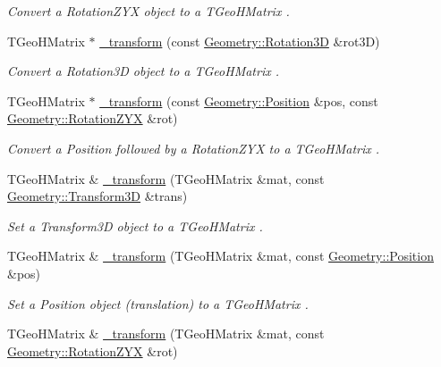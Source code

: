 \begin{DoxyCompactItemize}
\begin{DoxyCompactList}\small\item\em Convert a Rotation\+Z\+YX object to a T\+Geo\+H\+Matrix . \end{DoxyCompactList}\item 
T\+Geo\+H\+Matrix $\ast$ \hyperlink{group___d_d4_h_e_p___g_e_o_m_e_t_r_y_ga2b988c5fb8e427e757080009b3a4856f}{\+\_\+transform} (const \hyperlink{namespace_d_d4hep_1_1_geometry_a022fecb763315fa2bf39cbb648944a0e}{Geometry\+::\+Rotation3D} \&rot3D)
\begin{DoxyCompactList}\small\item\em Convert a Rotation3D object to a T\+Geo\+H\+Matrix . \end{DoxyCompactList}\item 
T\+Geo\+H\+Matrix $\ast$ \hyperlink{group___d_d4_h_e_p___g_e_o_m_e_t_r_y_gad6f7e93a5f8c5ae037658aa594d2f83b}{\+\_\+transform} (const \hyperlink{namespace_d_d4hep_1_1_geometry_a55083902099d03506c6db01b80404900}{Geometry\+::\+Position} \&pos, const \hyperlink{namespace_d_d4hep_1_1_geometry_a24667b2b9c3cec3d5239828db4d52189}{Geometry\+::\+Rotation\+Z\+YX} \&rot)
\begin{DoxyCompactList}\small\item\em Convert a Position followed by a Rotation\+Z\+YX to a T\+Geo\+H\+Matrix . \end{DoxyCompactList}\item 
T\+Geo\+H\+Matrix \& \hyperlink{group___d_d4_h_e_p___g_e_o_m_e_t_r_y_gae56d3e609e5195af8ba7271391b608e5}{\+\_\+transform} (T\+Geo\+H\+Matrix \&mat, const \hyperlink{namespace_d_d4hep_1_1_geometry_aeb4c0356d12fd7be49a0aae50514e64b}{Geometry\+::\+Transform3D} \&trans)
\begin{DoxyCompactList}\small\item\em Set a Transform3D object to a T\+Geo\+H\+Matrix . \end{DoxyCompactList}\item 
T\+Geo\+H\+Matrix \& \hyperlink{group___d_d4_h_e_p___g_e_o_m_e_t_r_y_ga115e4b33b3d4b31fc0c2a2de57c8a14b}{\+\_\+transform} (T\+Geo\+H\+Matrix \&mat, const \hyperlink{namespace_d_d4hep_1_1_geometry_a55083902099d03506c6db01b80404900}{Geometry\+::\+Position} \&pos)
\begin{DoxyCompactList}\small\item\em Set a Position object (translation) to a T\+Geo\+H\+Matrix . \end{DoxyCompactList}\item 
T\+Geo\+H\+Matrix \& \hyperlink{group___d_d4_h_e_p___g_e_o_m_e_t_r_y_gae00745e30557512fe1da42fc705d42d1}{\+\_\+transform} (T\+Geo\+H\+Matrix \&mat, const \hyperlink{namespace_d_d4hep_1_1_geometry_a24667b2b9c3cec3d5239828db4d52189}{Geometry\+::\+Rotation\+Z\+YX} \&rot)

\end{DoxyCompactItemize}
